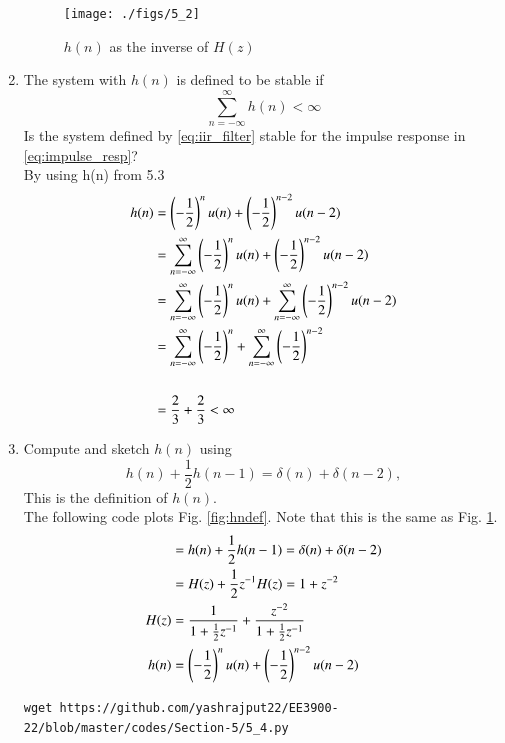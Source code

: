 \begin{enumerate}[label=\thesection.\arabic*]
\begin{figure}[!ht]
\centering
\texttt{[image: ./figs/5\_2]}
\caption{$h(n)$ as the inverse of $H(z)$}
\label{fig:hn}
\end{figure}
%
\item The system with $h(n)$ is defined to be stable if
\begin{equation}
\sum_{n=-\infty}^{\infty}h(n) < \infty
\end{equation}
Is the system defined by \eqref{eq:iir_filter} stable for the impulse response in \eqref{eq:impulse_resp}?
\\
\solution By using h(n) from 5.3
\begin{align}
h(n) &= \left(-\frac{1}{2}\right)^{n}u(n) + \left(-\frac{1}{2}\right)^{n-2}u(n-2)
\\
&= \sum_{n=-\infty}^{\infty} \left(-\frac{1}{2}\right)^{n}u(n) + \left(-\frac{1}{2}\right)^{n-2}u(n-2)
\\
&= \sum_{n=-\infty}^{\infty} \left(-\frac{1}{2}\right)^{n}u(n) + \sum_{n=-\infty}^{\infty}  \left(-\frac{1}{2}\right)^{n-2}u(n-2) 
\\
&= \sum_{n=-\infty}^{\infty} \left(-\frac{1}{2}\right)^{n} + \sum_{n=-\infty}^{\infty}  \left(-\frac{1}{2}\right)^{n-2}
\\
\\
&= \frac{2}{3} + \frac{2}{3} < \infty 
\end{align}
%
\item 
Compute and sketch $h(n)$ using 
\begin{equation}
\label{eq:iir_filter_h}
h(n) + \frac{1}{2}h(n-1) = \delta(n) + \delta(n-2), 
\end{equation}
%
This is the definition of $h(n)$.
\\
\solution The following code plots Fig. \ref{fig:hndef}. Note that this is the same as Fig. 
\ref{fig:hn}. 
\begin{align}
&= h(n) + \frac{1}{2}h(n-1) = \delta(n) + \delta(n-2)
\\
&= H(z) + \frac{1}{2}z^{-1}H(z) = 1+z^{-2}
\\
H(z) &= \frac{1}{1 + \frac{1}{2}z^{-1}} + \frac{ z^{-2}}{1 + \frac{1}{2}z^{-1}}
\\
h(n) &= \left(-\frac{1}{2}\right)^{n}u(n) + \left(-\frac{1}{2}\right)^{n-2}u(n-2)
\end{align}
%
\begin{lstlisting}
wget https://github.com/yashrajput22/EE3900-22/blob/master/codes/Section-5/5_4.py
\end{lstlisting}
\begin{figure}[!ht]
\centering

\end{figure}
\end{enumerate}
